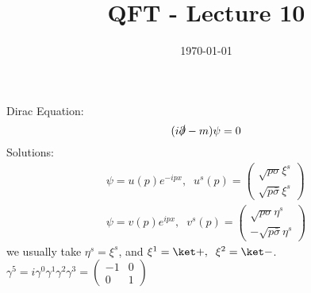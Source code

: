 \documentclass[]{scrartcl}
\title{QFT - Lecture 10}
\author{}
\date{\today}
\begin{document}
\maketitle
\newpage
\tableofcontents
\newpage

Dirac Equation:
$$
	(i\slashed\partial - m) \psi = 0
$$
Solutions:
\begin{gather}
	\psi = u(p)e^{-ipx},\;\; u^s(p) = 
	\begin{pmatrix}
		\sqrt{p\sigma}\xi^s\\
		\sqrt{p\bar\sigma}\xi^s
	\end{pmatrix}\\
	\psi = v(p)e^{ipx},\;\; v^s(p) =
	\begin{pmatrix}
		\sqrt{p\sigma}\eta^s\\
		-\sqrt{p\bar\sigma}\eta^s
	\end{pmatrix}
\end{gather}
we usually take $\eta^s = \xi^s$, and $\xi^1 = \ket +,\;\; \xi^2 = \ket -$.\\
$\gamma^5 = i\gamma^0\gamma^1\gamma^2\gamma^3 =
\begin{pmatrix}
	-1 & 0 \\ 0 & 1
\end{pmatrix}$
\end{document}
